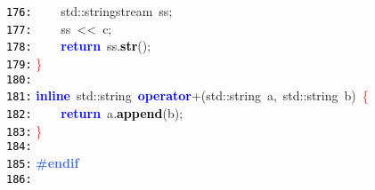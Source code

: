 \documentclass[a4paper,10pt]{scrartcl}
\begin{document}
{   \mbox{}\texttt{\textcolor{Black}{176:}} \ \ \ \ std\textcolor{BrickRed}{::}\textcolor{TealBlue}{stringstream}\ ss\textcolor{BrickRed}{;} \\
   \mbox{}\texttt{\textcolor{Black}{177:}} \ \ \ \ ss\ \textcolor{BrickRed}{\textless{}\textless{}}\ c\textcolor{BrickRed}{;} \\
   \mbox{}\texttt{\textcolor{Black}{178:}} \ \ \ \ \textbf{\textcolor{Blue}{return}}\ ss\textcolor{BrickRed}{.}\textbf{\textcolor{Black}{str}}\textcolor{BrickRed}{();} \\
   \mbox{}\texttt{\textcolor{Black}{179:}} \textcolor{Red}{\}} \\
   \mbox{}\texttt{\textcolor{Black}{180:}}  \\
   \mbox{}\texttt{\textcolor{Black}{181:}} \textbf{\textcolor{Blue}{inline}}\ std\textcolor{BrickRed}{::}\textcolor{TealBlue}{string}\ \textbf{\textcolor{Blue}{operator}}\textcolor{BrickRed}{+(}std\textcolor{BrickRed}{::}\textcolor{TealBlue}{string}\ a\textcolor{BrickRed}{,}\ std\textcolor{BrickRed}{::}\textcolor{TealBlue}{string}\ b\textcolor{BrickRed}{)}\ \textcolor{Red}{\{} \\
   \mbox{}\texttt{\textcolor{Black}{182:}} \ \ \ \ \textbf{\textcolor{Blue}{return}}\ a\textcolor{BrickRed}{.}\textbf{\textcolor{Black}{append}}\textcolor{BrickRed}{(}b\textcolor{BrickRed}{);} \\
   \mbox{}\texttt{\textcolor{Black}{183:}} \textcolor{Red}{\}} \\
   \mbox{}\texttt{\textcolor{Black}{184:}}  \\
   \mbox{}\texttt{\textcolor{Black}{185:}} \textbf{\textcolor{RoyalBlue}{\#endif}} \\
   \mbox{}\texttt{\textcolor{Black}{186:}} 
   }
   \normalsize
   
   
\end{document}
